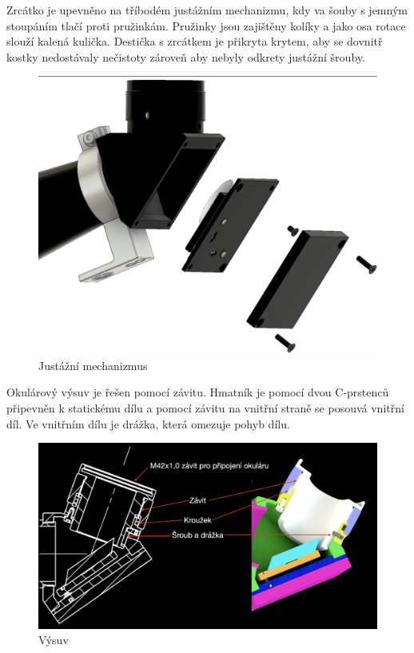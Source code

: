 \documentclass[
]{article}
\begin{document}
Zrcátko je upevněno na tříbodém justážním mechanizmu, kdy va šouby s
jemným stoupáním tlačí proti pružinkám. Pružinky jsou zajištěny kolíky a
jako osa rotace slouží kalená kulička. Destička s zrcátkem je přikryta
krytem, aby se dovnitř kostky nedostávaly nečistoty zároveň aby nebyly
odkrety justážní šrouby.

\begin{figure}
\centering
\includegraphics{imgs/justazni_mechanizmus.png}
\caption{Justážní mechanizmus}
\end{figure}

Okulárový výsuv je řešen pomocí závitu. Hmatník je pomocí dvou
C-prstenců připevněn k statickému dílu a pomocí závitu na vnitřní straně
se posouvá vnitřní díl. Ve vnitřním dílu je drážka, která omezuje pohyb
dílu.

\begin{figure}
\centering
\includegraphics{imgs/vysuv.png}
\caption{Výsuv}
\end{figure}
\end{document}
